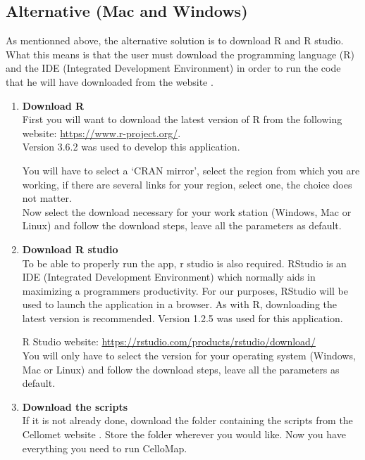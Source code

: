 \documentclass[11pt]{article}
\begin{document}
\subsection{Alternative (Mac and Windows)\label{alter_install}}
As mentionned above, the alternative solution is to download R and R studio. What this means is that the user must download the programming language (R) and the \acrshort{IDE} (Integrated Development Environment) in order to run the code that he will have downloaded from the website \cite{Cellomet}.
\begin{enumerate}
\item \textbf{Download R}\\
First you will want to download the latest version of R from the following website: \url{https://www.r-project.org/}.
\\Version 3.6.2 was used to develop this application.

You will have to select a `CRAN mirror', select the region from which you are working, if there are several links for your region, select one, the choice does not matter.\\
Now select the download necessary for your work station (Windows, Mac or Linux) and follow the download steps, leave all the parameters as default.
\item \textbf{Download R studio}\\
To be able to properly run the app, r studio is also required. RStudio is an IDE (Integrated Development Environment) which normally aids in maximizing a programmers productivity. For our purposes, RStudio will be used to launch the application in a browser. As with R, downloading the latest version is recommended. Version 1.2.5 was used for this application.

R Studio website: \url{https://rstudio.com/products/rstudio/download/}
\\

You will only have to select the version for your operating system (Windows, Mac or Linux) and follow the download steps, leave all the parameters as default.
\item \textbf{Download the scripts}\\
If it is not already done, download the folder containing the scripts from the Cellomet website \cite{Cellomet}.
Store the folder wherever you would like. Now you have everything you need to run CelloMap.


\end{enumerate}
\end{document}
